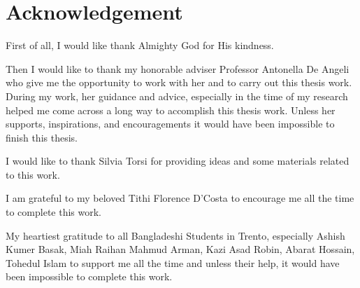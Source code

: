 \setcounter{page}{2}
{}
\chapter*{Acknowledgement}
First of all, I would like thank Almighty God for His kindness.

Then I would like to thank my honorable adviser Professor Antonella De Angeli
who give me the opportunity to work with her and to carry out this thesis work.
During my work, her guidance and advice, especially in the time of my research
helped me come across a long way to accomplish this thesis work. Unless her
supports, inspirations, and encouragements it would have been impossible to finish
this thesis.

I would like to thank Silvia Torsi for providing ideas and some materials
related to this  work.

I am grateful to my beloved Tithi Florence D'Costa to encourage me all the time
to complete this work.

My heartiest gratitude to all Bangladeshi Students in Trento, especially Ashish
Kumer Basak, Miah Raihan Mahmud Arman, Kazi Asad Robin, Abarat Hossain, Tohedul
Islam to support me all the time and unless their help, it would have been
impossible to complete this work.

\newpage